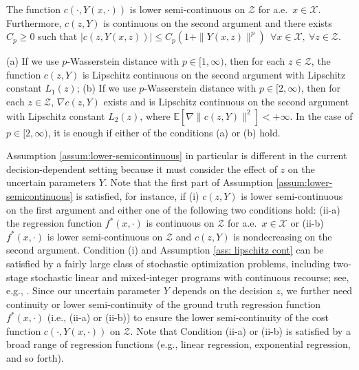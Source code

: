 \documentclass[onefignum,onetabnum]{siamart251216}
\begin{document}
\begin{assumption}\label{assum:lower-semicontinuous}
    The function $c(\cdot,Y(x,\cdot))$ is lower semi-continuous on $\mathcal{Z}$ for a.e.\ $x \in \mathcal{X}$. 
     Furthermore, $c(z,Y)$ is continuous on the second argument and
   there exists $C_p \geq 0$ such that
$
        |c(z,Y(x,z))| \leq C_p(1+\|Y(x,z)\|^p) \ \ \forall x \in \mathcal{X},\ \forall z \in \mathcal{Z}.
$
\end{assumption}


\begin{assumption}
\label{ass: lipschitz cont}
(a) If we use $p$-Wasserstein distance with $p \in [1,\infty)$, then for each $z \in \mathcal{Z}$, the function $c(z,Y)$ is Lipschitz continuous on the second argument with Lipschitz constant $L_1(z)$; 
(b) If we use $p$-Wasserstein distance with $p \in [2, \infty)$, then for each $z\in\mathcal{Z}$, $\nabla c(z,Y)$ exists and is Lipschitz continuous on the second argument with Lipschitz constant $L_2(z)$,  where  $\mathbb{E}[\nabla\|c(z,Y)\|^2] < +\infty$. In the case of $p \in [2, \infty)$, it is enough if either of the conditions (a) or (b) hold.
\end{assumption}

Assumption \ref{assum:lower-semicontinuous} in particular is different in the current decision-dependent setting because it must consider the effect of $z$ on the uncertain parameters $Y$.
Note that the first part of Assumption \ref{assum:lower-semicontinuous} is satisfied, for instance, if (i) $c(z,Y)$ is lower semi-continuous on the first argument and either one of the following two conditions hold: (ii-a) the regression function $f^*(x,\cdot)$ is continuous on $\mathcal{Z}$ for a.e.\ $x \in \mathcal{X}$ or (ii-b) $f^*(x,\cdot)$ is lower semi-continuous on $\mathcal{Z}$ 
and $c(z,Y)$ is nondecreasing on the second argument. Condition (i) and Assumption \ref{ass: lipschitz cont} can be satisfied by a fairly large class of stochastic optimization problems, including two-stage stochastic linear and mixed-integer programs with continuous recourse; see, e.g., \cite[][Appendix E]{kannan2025data}. Since our uncertain parameter $Y$ depends on the decision $z$, we further need continuity or lower semi-continuity of the ground truth regression function $f^*(x,\cdot)$ (i.e., (ii-a) or (ii-b)) to ensure the lower semi-continuity of the cost function $c(\cdot,Y(x,\cdot))$ on $\mathcal{Z}$. Note that Condition (ii-a) or (ii-b) is satisfied by a broad range of regression functions (e.g., linear regression, exponential regression, and so forth).  
\end{document}
